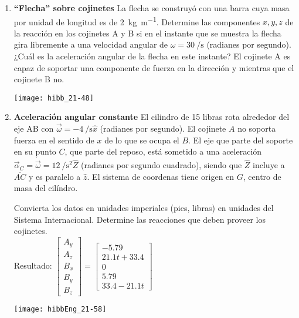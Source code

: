 \documentclass[11pt, spanish, a4paper, twoside]{article}
\begin{document}
\begin{enumerate}
	\item 
	\begin{minipage}[t][4.5cm]{0.55\textwidth}
		\textbf{``Flecha'' sobre cojinetes}
		La flecha se construyó con una barra cuya masa por unidad de longitud es de \SI{2}{\kilo\gram\per\metre}.
		Determine las componentes \(x, y, z\) de la reacción en los cojinetes A y B si en el instante que se muestra la flecha gira libremente a una velocidad angular de \(\omega = \SI{30}{\per\second}\) (radianes por segundo).
		¿Cuál es la aceleración angular de la flecha en este instante?
		El cojinete A es capaz de soportar una componente de fuerza en la dirección y mientras que el cojinete B no.
	\end{minipage}
	\begin{minipage}[c][0cm][t]{0.4\textwidth}
		\texttt{[image: hibb\_21-48]}
	\end{minipage}


	\item 
	\begin{minipage}[t][7cm]{0.65\textwidth}
		\textbf{Aceleración angular constante}
		El cilindro de 15 libras rota alrededor del eje AB con \(\vec{\omega} = -\SI{4}{\per\second} \hat{x}\) (radianes por segundo).
		El cojinete \(A\) no soporta fuerza en el sentido de \(x\) de lo que se ocupa el \(B\).
		El eje que parte del soporte en su punto \(C\), que parte del reposo, está sometido a una aceleración \(\vec{\alpha}_C = \dot{\vec{\omega}} = \SI{12}{\per\second\squared} \hat{Z}\) (radianes por segundo cuadrado), siendo que \(\hat{Z}\) incluye a \(\overline{AC}\) y es paralelo a \(\hat{z}\).
		El sistema de coordenas tiene origen en \(G\), centro de masa del cilíndro.
		\begin{tasks}
			\task Convierta los datos en unidades imperiales (pies, libras) en unidades del Sistema Internacional.
			\task Determine las reacciones que deben proveer los cojinetes.\\
			Resultado: \(
			\left[\begin{matrix}A_{y}\\A_{z}\\B_{x}\\B_{y}\\B_{z}\end{matrix}\right] = \left[\begin{matrix}-5.79\\21.1 t + 33.4\\0\\5.79\\33.4 - 21.1 t\end{matrix}\right]
			\)
		\end{tasks}
	\end{minipage}
	\begin{minipage}[c][2cm][t]{0.3\textwidth}
		\texttt{[image: hibbEng\_21-58]}
	\end{minipage}



\end{enumerate}
\end{document}
